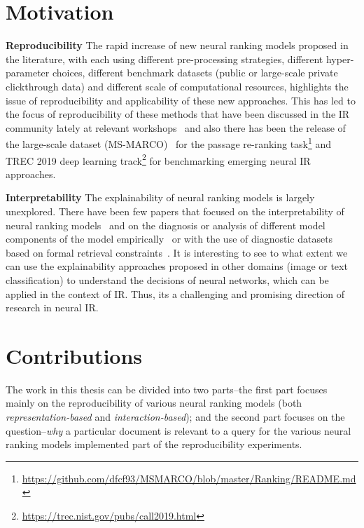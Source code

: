 \section{Motivation}
\textbf{Reproducibility} The rapid increase of new neural ranking models proposed in the literature, with each using different pre-processing strategies, different hyper-parameter choices, different benchmark datasets (public or large-scale private clickthrough data) and different scale of computational resources, highlights the issue of reproducibility and applicability of these new approaches. This has led to the focus of reproducibility of these methods that have been discussed in the IR community lately at relevant workshops~\citep{craswell2017sigir, Craswell2018sigir_forum} and also there has been the release of the large-scale dataset (MS-MARCO)~\citep{nguyen2016ms_marco} for the passage re-ranking task\footnote{\url{https://github.com/dfcf93/MSMARCO/blob/master/Ranking/README.md}} and TREC 2019 deep learning track\footnote{\url{https://trec.nist.gov/pubs/call2019.html}} for benchmarking emerging neural IR approaches.  

\textbf{Interpretability} The explainability of neural ranking models is largely unexplored. There have been few papers that focused on the interpretability of neural ranking models~\citep{Singh19} and on the diagnosis or analysis of different model components of the model empirically~\citep{PangLG0C17, Cohen18} or with the use of diagnostic datasets based on formal retrieval constraints~\citep{Rennings19}. It is interesting to see to what extent we can use the explainability approaches proposed in other domains (image or text classification) to understand the decisions of neural networks, which can be applied in the context of IR. Thus, its a challenging and promising direction of research in neural IR.

\section{Contributions}

The work in this thesis can be divided into two parts--the first part focuses mainly on the reproducibility of various neural ranking models (both \textit{representation-based} and \textit{interaction-based}); and the second part focuses on the question--\textit{why} a particular document is relevant to a query for the various neural ranking models implemented part of the reproducibility experiments. 


